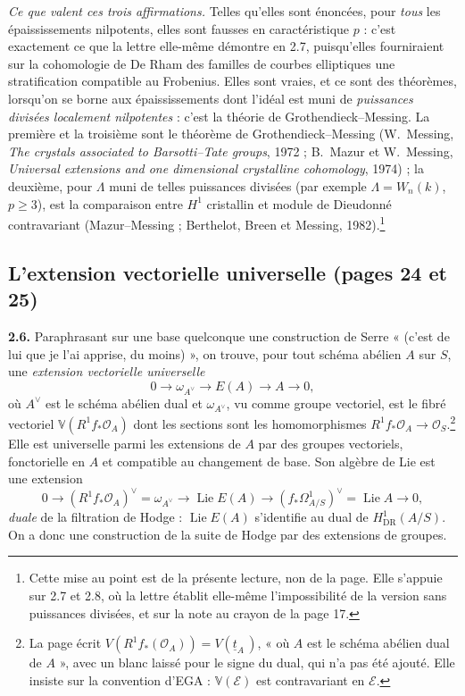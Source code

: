 \documentclass[11pt,a4paper]{article}
\begin{document}
\emph{Ce que valent ces trois affirmations.} Telles qu'elles sont énoncées, pour
\emph{tous} les épaississements nilpotents, elles sont fausses en
caractéristique $p$ : c'est exactement ce que la lettre elle-même démontre en
2.7, puisqu'elles fourniraient sur la cohomologie de De Rham des familles de
courbes elliptiques une stratification compatible au Frobenius. Elles sont
vraies, et ce sont des théorèmes, lorsqu'on se borne aux épaississements dont
l'idéal est muni de \emph{puissances divisées localement nilpotentes} : c'est
la théorie de Grothendieck--Messing. La première et la troisième sont le
théorème de Grothendieck--Messing (W.~Messing, \emph{The crystals associated to
Barsotti--Tate groups}, 1972 ; B.~Mazur et W.~Messing, \emph{Universal extensions
and one dimensional crystalline cohomology}, 1974) ; la deuxième, pour $\Lambda$
muni de telles puissances divisées (par exemple $\Lambda = W_n(k)$, $p \geq 3$),
est la comparaison entre $H^1$ cristallin et module de Dieudonné
contravariant (Mazur--Messing ; Berthelot, Breen et Messing, 1982).\footnote{Cette
mise au point est de la présente lecture, non de la page. Elle s'appuie sur
2.7 et 2.8, où la lettre établit elle-même l'impossibilité de la version sans
puissances divisées, et sur la note au crayon de la page 17.}

\subsection*{L'extension vectorielle universelle (pages 24 et 25)}

\textbf{2.6.} Paraphrasant sur une base quelconque une construction de Serre
« (c'est de lui que je l'ai apprise, du moins) », on trouve, pour tout schéma
abélien $A$ sur $S$, une \emph{extension vectorielle universelle}
\[
  0 \longrightarrow \omega_{A^\vee} \longrightarrow E(A) \longrightarrow A
  \longrightarrow 0 ,
\]
où $A^\vee$ est le schéma abélien dual et $\omega_{A^\vee}$, vu comme groupe
vectoriel, est le fibré vectoriel $\mathbb{V}(R^1f_*\mathcal{O}_A)$ dont les
sections sont les homomorphismes
$R^1f_*\mathcal{O}_A \to \mathcal{O}_S$.\footnote{La page écrit
$V(R^1f_*(\mathcal{O}_A)) = V(\underline{t}_{A\ })$, « où $A$ est le schéma
abélien dual de $A$ », avec un blanc laissé pour le signe du dual, qui n'a pas
été ajouté. Elle insiste sur la convention d'EGA : $\mathbb{V}(\mathcal{E})$ est
contravariant en $\mathcal{E}$.} Elle est universelle parmi les extensions de
$A$ par des groupes vectoriels, fonctorielle en $A$ et compatible au changement
de base. Son algèbre de Lie est une extension
\[
  0 \longrightarrow (R^1f_*\mathcal{O}_A)^\vee = \omega_{A^\vee}
  \longrightarrow \operatorname{Lie}E(A) \longrightarrow
  (f_*\Omega^1_{A/S})^\vee = \operatorname{Lie}A \longrightarrow 0 ,
\]
\emph{duale} de la filtration de Hodge : $\operatorname{Lie}E(A)$ s'identifie
au dual de $H^1_{\mathrm{DR}}(A/S)$. On a donc une construction de la suite de
Hodge par des extensions de groupes.
\end{document}
